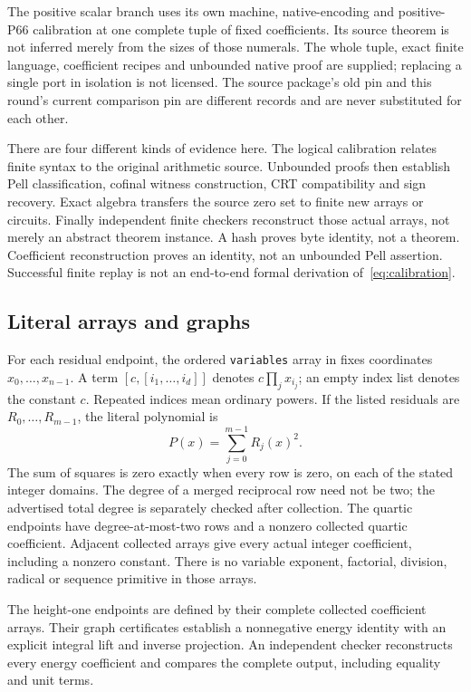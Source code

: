 The positive scalar branch uses its own machine, native-encoding and
positive-P66 calibration at one complete tuple of fixed coefficients.
Its source theorem is not inferred merely from the sizes of those numerals.
The whole tuple, exact finite language, coefficient recipes and unbounded
native proof are supplied; replacing a single port in isolation is not
licensed. The source package's old pin and this round's current comparison
pin are different records and are never substituted for each other.

There are four different kinds of evidence here. The logical calibration
relates finite syntax to the original arithmetic source. Unbounded proofs
then establish Pell classification, cofinal witness construction, CRT
compatibility and sign recovery. Exact algebra transfers the source zero
set to finite new arrays or circuits. Finally independent finite checkers
reconstruct those actual arrays, not merely an abstract theorem instance.
A hash proves byte identity, not a theorem. Coefficient reconstruction proves
an identity, not an unbounded Pell assertion. Successful finite replay is
not an end-to-end formal derivation of~\eqref{eq:calibration}.

\subsection{Literal arrays and graphs}
For each residual endpoint, the ordered \texttt{variables} array in
 fixes coordinates $x_0,\ldots,x_{n-1}$. A term
$[c,[i_1,\ldots,i_d]]$ denotes $c\prod_jx_{i_j}$; an empty index list
denotes the constant $c$. Repeated indices mean ordinary powers. If the
listed residuals are $R_0,\ldots,R_{m-1}$, the literal polynomial is
\begin{equation}\label{eq:sos}
 P(x)=\sum_{j=0}^{m-1}R_j(x)^2.
\end{equation}
The sum of squares is zero exactly when every row is zero, on each of the
stated integer domains. The degree of a merged reciprocal row need not be
two; the advertised total degree is separately checked after collection.
The quartic endpoints have degree-at-most-two rows and a nonzero collected
quartic coefficient. Adjacent collected arrays give every actual integer
coefficient, including a nonzero constant. There is no variable exponent,
factorial, division, radical or sequence primitive in those arrays.

The height-one endpoints are defined by their complete collected
coefficient arrays. Their graph certificates establish a nonnegative
energy identity with an explicit integral lift and inverse projection.
An independent checker reconstructs every energy coefficient and compares
the complete output, including equality and unit terms.

